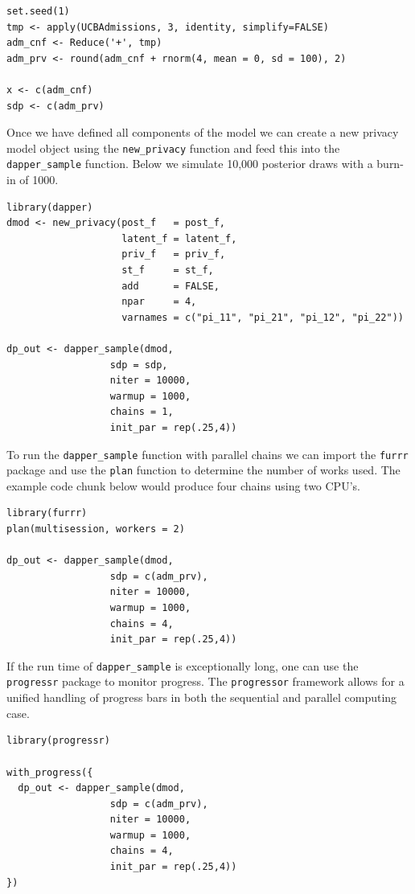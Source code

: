 \begin{verbatim}
set.seed(1)
tmp <- apply(UCBAdmissions, 3, identity, simplify=FALSE)
adm_cnf <- Reduce('+', tmp)
adm_prv <- round(adm_cnf + rnorm(4, mean = 0, sd = 100), 2)

x <- c(adm_cnf)
sdp <- c(adm_prv)
\end{verbatim}

Once we have defined all components of the model we can
create a new privacy model object using the \texttt{new\_privacy} function and
feed this into the \texttt{dapper\_sample} function. Below we simulate 10,000 posterior
draws with a burn-in of 1000.

\begin{verbatim}
library(dapper)
dmod <- new_privacy(post_f   = post_f,
                    latent_f = latent_f,
                    priv_f   = priv_f,
                    st_f     = st_f,
                    add      = FALSE,
                    npar     = 4,
                    varnames = c("pi_11", "pi_21", "pi_12", "pi_22"))
                  
dp_out <- dapper_sample(dmod,
                  sdp = sdp,
                  niter = 10000,
                  warmup = 1000,
                  chains = 1,
                  init_par = rep(.25,4))
\end{verbatim}

To run the \texttt{dapper\_sample} function with parallel chains
we can import the \texttt{furrr} package and use the \texttt{plan} function
to determine the number of works used. The example code chunk below
would produce four chains using two CPU's.

\begin{verbatim}
library(furrr)
plan(multisession, workers = 2)

dp_out <- dapper_sample(dmod,
                  sdp = c(adm_prv),
                  niter = 10000,
                  warmup = 1000,
                  chains = 4,
                  init_par = rep(.25,4))
\end{verbatim}

If the run time of \texttt{dapper\_sample} is exceptionally long, one can
use the \texttt{progressr} package to monitor progress. The \texttt{progressor} framework
allows for a unified handling of progress bars in both the sequential and
parallel computing case.

\begin{verbatim}
library(progressr)

with_progress({
  dp_out <- dapper_sample(dmod,
                  sdp = c(adm_prv),
                  niter = 10000,
                  warmup = 1000,
                  chains = 4,
                  init_par = rep(.25,4))
})
\end{verbatim}

